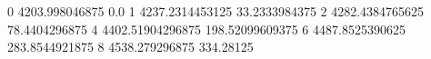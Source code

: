 0 4203.998046875 0.0
1 4237.2314453125 33.2333984375
2 4282.4384765625 78.4404296875
4 4402.51904296875 198.52099609375
6 4487.8525390625 283.8544921875
8 4538.279296875 334.28125
